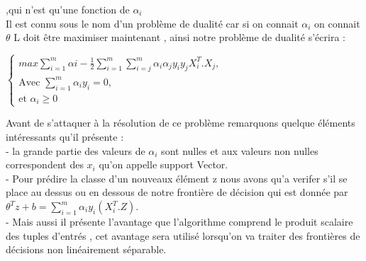   ,qui n'est qu'une fonction de ${\alpha}_{i}$ \\
Il est connu sous le nom d'un problème de dualité car si on connait ${\alpha}_{i}$ on connait ${\theta}$  
L doit être maximiser maintenant , ainsi notre problème de dualité s'écrira :\\
\begin{center}
	$ \left\{\begin{array}{ll}
	max \sum _{i=1}^{m} {\alpha}{i} -  \frac{1}{2} \sum _{i=1}^{m} \sum _{i=j}^{m} {\alpha}_{i}{\alpha}_{j}{y}_{i}{y}_{j} {X}_{i}^{T} . {{X}_{j}},&  \\
	\mbox{Avec } \sum _{i=1}^{m}{\alpha}_{i}{y}_{i}=0 , & \\
	\mbox{et }{\alpha}_{i} \ge 0 
	\end{array}\right.$
\end{center}
Avant de s'attaquer à la résolution de ce problème remarquons quelque éléments intéressants qu'il présente :\\
-  la grande partie des valeurs de ${\alpha}_{i}$ sont nulles et  aux    valeurs non nulles correspondent des ${x}_{i}$ qu'on appelle support Vector.\\
-  Pour prédire la classe d'un  nouveaux élément z nous avons qu'a verifer s'il se place au dessus ou en dessous de notre frontière de décision qui est donnée par ${\theta }^{T}{z} + b =  \sum _{i=1}^{m}{\alpha}_{i}{y}_{i}({X}^{T}_{i}.Z) $. \\
- Mais aussi il présente l'avantage que l'algorithme comprend le produit scalaire des tuples d'entrés , cet avantage sera utilisé lorsqu'on va traiter des frontières de  décisions non linéairement séparable.
